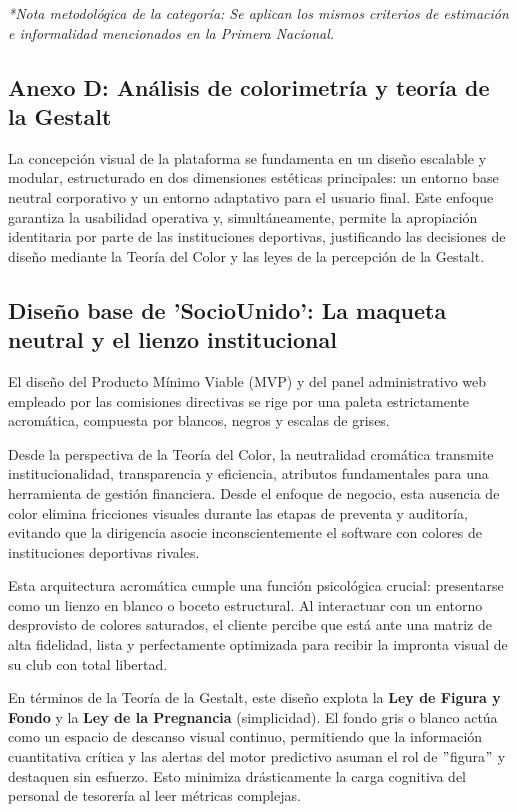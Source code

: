 \textit{*Nota metodológica de la categoría: Se aplican los mismos criterios de estimación e informalidad mencionados en la Primera Nacional.}

\newpage

\subsection{Anexo D: Análisis de colorimetría y teoría de la Gestalt}

La concepción visual de la plataforma se fundamenta en un diseño escalable y modular, estructurado en dos dimensiones estéticas principales: un entorno base neutral corporativo y un entorno adaptativo para el usuario final. Este enfoque garantiza la usabilidad operativa y, simultáneamente, permite la apropiación identitaria por parte de las instituciones deportivas, justificando las decisiones de diseño mediante la Teoría del Color y las leyes de la percepción de la Gestalt.

\subsection{Diseño base de 'SocioUnido': La maqueta neutral y el lienzo institucional}

El diseño del Producto Mínimo Viable (MVP) y del panel administrativo web empleado por las comisiones directivas se rige por una paleta estrictamente acromática, compuesta por blancos, negros y escalas de grises.

Desde la perspectiva de la Teoría del Color, la neutralidad cromática transmite institucionalidad, transparencia y eficiencia, atributos fundamentales para una herramienta de gestión financiera. Desde el enfoque de negocio, esta ausencia de color elimina fricciones visuales durante las etapas de preventa y auditoría, evitando que la dirigencia asocie inconscientemente el software con colores de instituciones deportivas rivales.

Esta arquitectura acromática cumple una función psicológica crucial: presentarse como un lienzo en blanco o boceto estructural. Al interactuar con un entorno desprovisto de colores saturados, el cliente percibe que está ante una matriz de alta fidelidad, lista y perfectamente optimizada para recibir la impronta visual de su club con total libertad.

En términos de la Teoría de la Gestalt, este diseño explota la \textbf{Ley de Figura y Fondo} y la \textbf{Ley de la Pregnancia} (simplicidad). El fondo gris o blanco actúa como un espacio de descanso visual continuo, permitiendo que la información cuantitativa crítica y las alertas del motor predictivo asuman el rol de $"$figura$"$ y destaquen sin esfuerzo. Esto minimiza drásticamente la carga cognitiva del personal de tesorería al leer métricas complejas.

